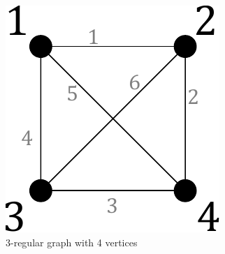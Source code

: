 \begin{enumerate}
{        \begin{figure}[H]
            \centering
            \includegraphics[scale=0.7]{figures/3_10_3-conn-6-edge.pdf} %
            \caption{3-regular graph with 4 vertices}
            \label{fig:3_10}
        \end{figure}
    }
\end{enumerate}

